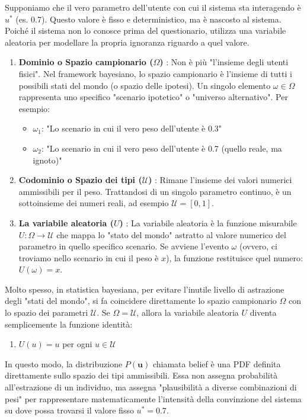 Supponiamo che il vero parametro dell'utente con cui il sistema sta interagendo è $u^*$ (es. 0.7). Questo valore è fisso e deterministico, ma è nascosto al sistema. Poiché il sistema non lo conosce prima del questionario, utilizza una variabile aleatoria per modellare la propria ignoranza riguardo a quel valore.
\begin{enumerate}
    \item \textbf{Dominio o Spazio campionario ($\Omega$)} : Non è più "l'insieme degli utenti fisici". Nel framework bayesiano, lo spazio campionario è l'insieme di tutti i possibili stati del mondo (o spazio delle ipotesi).
Un singolo elemento $\omega \in \Omega$ rappresenta uno specifico "scenario ipotetico" o "universo alternativo". Per esempio:
    \begin{itemize}
        \item $\omega_1$: "Lo scenario in cui il vero peso dell'utente è 0.3"
        \item $\omega_2$: "Lo scenario in cui il vero peso dell'utente è 0.7 (quello reale, ma ignoto)"
    \end{itemize}
    \item \textbf{Codominio o Spazio dei tipi ($\mathcal{U}$)} : Rimane l'insieme dei valori numerici ammissibili per il peso. Trattandosi di un singolo parametro continuo, è un sottoinsieme dei numeri reali, ad esempio $\mathcal{U} = [0, 1]$.
    \item \textbf{La variabile aleatoria ($U$)} : La variabile aleatoria è la funzione misurabile $U: \Omega \to \mathcal{U}$ che mappa lo "stato del mondo" astratto al valore numerico del parametro in quello specifico scenario.
Se avviene l'evento $\omega$ (ovvero, ci troviamo nello scenario in cui il peso è $x$), la funzione restituisce quel numero: $U(\omega) = x$.
\end{enumerate}
Molto spesso, in statistica bayesiana, per evitare l'inutile livello di astrazione degli "stati del mondo", si fa coincidere direttamente lo spazio campionario $\Omega$ con lo spazio dei parametri $\mathcal{U}$.
Se $\Omega = \mathcal{U}$, allora la variabile aleatoria $U$ diventa semplicemente la funzione identità:
\begin{enumerate}
    \item $U(u) = u$ per ogni $u \in \mathcal{U}$
\end{enumerate}
In questo modo, la distribuzione $P(\mathbf{u})$ chiamata belief è una PDF definita direttamente sullo spazio dei tipi ammissibili. Essa non assegna probabilità all'estrazione di un individuo, ma assegna "plausibilità a diverse combinazioni di pesi" per rappresentare matematicamente l'intensità della convinzione del sistema su dove possa trovarsi il valore fisso $u^* = 0.7$. 
